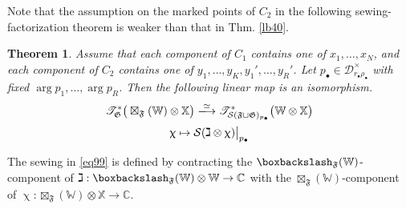 \documentclass[11pt,b5paper,notitlepage]{article}
\theoremstyle{definition}
\theoremstyle{plain}
\newtheorem{thm}[df]{Theorem}
\newcommand{\fk}{\mathfrak}
\newcommand{\blt}{\bullet}
\newcommand{\Xbb}{\mathbb X}
\newcommand{\Wbb}{\mathbb W}
\newcommand{\Cbb}{\mathbb C}
\newcommand{\<}{\left\langle}
\renewcommand{\>}{\right\rangle}
\newcommand{\ST}{\mathscr{T}}
\newcommand{\MD}{\mathcal{D}}
\newcommand{\MS}{\mathcal{S}}
\newcommand{\bbs}{\boxbackslash}
\newcommand{\ff}{\mathfrak{F}}
\newcommand{\fg}{\mathfrak{G}}
\numberwithin{equation}{section}
\begin{document}
Note that the assumption on the marked points of $C_2$ in the following sewing-factorization theorem is weaker than that in Thm. \ref{lb40}. 

\begin{thm}\label{lb43}
Assume that each component of $C_1$ contains one of $x_1,\dots,x_N$, and each component of $C_2$ contains one of $y_1,\dots,y_K,y_1',\dots,y_R'$.   Let $p_\blt\in\MD_{r_\blt\rho_\blt}^\times$ with fixed $\arg p_1,\dots,\arg p_R$. Then the following linear map is an isomorphism.
\begin{gather}\label{eq99}
\begin{gathered}
\ST_{\fg}^*\big(\boxtimes_\ff(\Wbb)\otimes \Xbb\big)\xlongrightarrow{\simeq} \ST_{\MS(\fk F\sqcup\fk G)_{p_\blt}}^*\big(\Wbb\otimes \Xbb\big)\\[0.5ex]
\upchi \mapsto \MS(\gimel\otimes \upchi)\big|_{p_\blt}
\end{gathered}
\end{gather}
\end{thm}

The sewing in \eqref{eq99} is defined by contracting the $\bbs_\ff(\Wbb)$-component of $\gimel:\bbs_\ff(\Wbb)\otimes\Wbb\rightarrow\Cbb$ with the $\boxtimes_\ff(\Wbb)$-component of $\upchi:\boxtimes_\ff(\Wbb)\otimes\Xbb\rightarrow\Cbb$.
\end{document}
